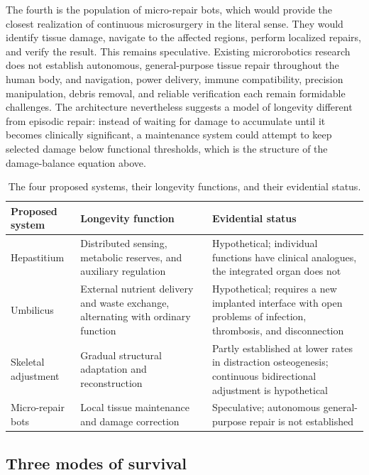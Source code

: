 \documentclass[11pt]{article}
\theoremstyle{plain}
\theoremstyle{definition}
\theoremstyle{remark}
\begin{document}
The fourth is the population of micro-repair bots, which would provide the closest realization of continuous microsurgery in the literal sense. They would identify tissue damage, navigate to the affected regions, perform localized repairs, and verify the result. This remains speculative. Existing microrobotics research does not establish autonomous, general-purpose tissue repair throughout the human body, and navigation, power delivery, immune compatibility, precision manipulation, debris removal, and reliable verification each remain formidable challenges. The architecture nevertheless suggests a model of longevity different from episodic repair: instead of waiting for damage to accumulate until it becomes clinically significant, a maintenance system could attempt to keep selected damage below functional thresholds, which is the structure of the damage-balance equation above.

\begin{table}[h]
\centering
\small
\begin{tabular}{p{3.2cm}p{5.2cm}p{5.2cm}}
\toprule
Proposed system & Longevity function & Evidential status\\
\midrule
Hepastitium & Distributed sensing, metabolic reserves, and auxiliary regulation & Hypothetical; individual functions have clinical analogues, the integrated organ does not\\
Umbilicus & External nutrient delivery and waste exchange, alternating with ordinary function & Hypothetical; requires a new implanted interface with open problems of infection, thrombosis, and disconnection\\
Skeletal adjustment & Gradual structural adaptation and reconstruction & Partly established at lower rates in distraction osteogenesis; continuous bidirectional adjustment is hypothetical\\
Micro-repair bots & Local tissue maintenance and damage correction & Speculative; autonomous general-purpose repair is not established\\
\bottomrule
\end{tabular}
\caption{The four proposed systems, their longevity functions, and their evidential status.}
\label{tab:systems}
\end{table}

\subsection{Three modes of survival}
\end{document}
